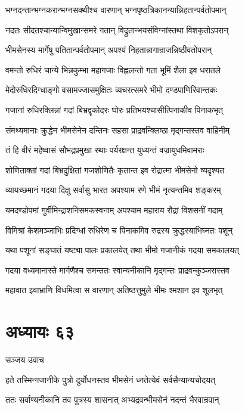 \twolineshloka
{भग्नदन्तान्भग्नकरान्भग्नसक्थीश्च वारणान्}
{भग्नपृष्ठत्रिकानन्यान्निहतान्पर्वतोपमान्}


\twolineshloka
{नदतः सीदतश्चान्यान्विमुखान्समरे गतान्}
{विद्रुतान्भयसंविग्नांस्तथा विशकृतोऽपरान्}


\twolineshloka
{भीमसेनस्य मार्गेषु पतितान्पर्वतोपमान्}
{अपश्यं निहतान्नागान्राजन्निष्ठीवतोपरान्}


\twolineshloka
{वमन्तो रुधिरं चान्ये भिन्नकुम्भा महागजाः}
{विह्नलन्तो गता भूमिं शैला इव धरातले}


\twolineshloka
{मेदोरुधिरदिग्धाङ्गो वसामज्जासमुक्षितः}
{व्यचरत्समरे भीमो दण्डपाणिरिवान्तकः}


\twolineshloka
{गजानां रुधिरक्लिन्नां गदां बिभ्रद्वृकोदरः}
{घोरः प्रतिभयश्चासीत्पिनाकीव पिनाकभृत्}


\twolineshloka
{संमथ्यमानाः क्रुद्धेन भीमसेनेन दन्तिनः}
{सहसा प्राद्रवन्क्लिष्ठा मृद्गन्तस्तव वाहिनीम्}


\twolineshloka
{तं हि वीरं महेष्वासं सौभद्रप्रमुखा रथाः}
{पर्यरक्षन्त युध्यन्तं वज्रायुधमिवामराः}


\twolineshloka
{शोणिताक्तां गदां बिभ्रदुक्षितां गजशोणितैः}
{कृतान्त इव रोद्रात्मा भीमसेनो व्यदृश्यत}


\twolineshloka
{व्यायच्छमानं गदया दिक्षु सर्वासु भारत}
{अपश्याम रणे भीमं नृत्यन्तमिव शङ्करम्}


\twolineshloka
{यमदण्डोपमां गुर्वीमिन्द्राशनिसमकस्वनाम्}
{अपश्याम महाराय रौद्रां विशसनीं गदाम्}


\twolineshloka
{विमिश्रां केशमञ्जाभिः प्रदिग्धां रुधिरेण च}
{पिनाकमिव रुद्रस्य क्रुद्धस्याभिघ्नतः पशून्}


\twolineshloka
{यथा पशूनां सङ्घातं यष्ट्या पालः प्रकालयेत्}
{तथा भीमो गजानीकं गदया समकालयत्}


\twolineshloka
{गदया वध्यमानास्ते मार्गणैश्च समन्ततः}
{स्वान्यनीकानि मृद्गन्तः प्राद्रवन्कुञ्जरास्तव}


\twolineshloka
{महावात इवाभ्राणि विधमित्वा स वारणान्}
{अतिष्ठत्तुमुले भीमः श्मशान इव शूलभृत्}


\chapter{अध्यायः ६३}
\twolineshloka
{सञ्जय उवाच}
{}


\twolineshloka
{हते तस्मिन्गजानीके पुत्रो दुर्योधनस्तव}
{भीमसेनं ध्नतेत्येवं सर्वसैन्यान्यचोदयत्}


\twolineshloka
{ततः सर्वाण्यनीकानि तव पुत्रस्य शासनात्}
{अभ्यद्रवन्भीमसेनं नदन्तं भैरवान्रवान्}


